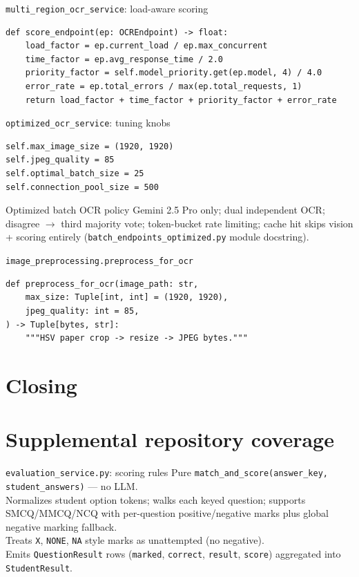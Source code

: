 \documentclass[aspectratio=169]{beamer}
\begin{document}
\begin{frame}[fragile]{\texttt{multi\_region\_ocr\_service}: load-aware scoring}
\begin{lstlisting}[style=py]
def score_endpoint(ep: OCREndpoint) -> float:
    load_factor = ep.current_load / ep.max_concurrent
    time_factor = ep.avg_response_time / 2.0
    priority_factor = self.model_priority.get(ep.model, 4) / 4.0
    error_rate = ep.total_errors / max(ep.total_requests, 1)
    return load_factor + time_factor + priority_factor + error_rate
\end{lstlisting}
\end{frame}

\begin{frame}[fragile]{\texttt{optimized\_ocr\_service}: tuning knobs}
\begin{lstlisting}[style=py]
self.max_image_size = (1920, 1920)
self.jpeg_quality = 85
self.optimal_batch_size = 25
self.connection_pool_size = 500
\end{lstlisting}
\end{frame}

\begin{frame}{Optimized batch OCR policy}
  \small
  Gemini 2.5 Pro only; dual independent OCR; disagree $\rightarrow$ third majority vote; token-bucket rate limiting; cache hit skips vision + scoring entirely (\texttt{batch\_endpoints\_optimized.py} module docstring).
\end{frame}

\begin{frame}[fragile]{\texttt{image\_preprocessing.preprocess\_for\_ocr}}
\begin{lstlisting}[style=py]
def preprocess_for_ocr(image_path: str,
    max_size: Tuple[int, int] = (1920, 1920),
    jpeg_quality: int = 85,
) -> Tuple[bytes, str]:
    """HSV paper crop -> resize -> JPEG bytes."""
\end{lstlisting}
\end{frame}

\section{Closing}

\section{Supplemental repository coverage}

\begin{frame}{\texttt{evaluation\_service.py}: scoring rules}
  \small
  Pure \texttt{match\_and\_score(answer\_key, student\_answers)} --- no LLM.\\
  Normalizes student option tokens; walks each keyed question; supports SMCQ/MMCQ/NCQ with per-question positive/negative marks plus global negative marking fallback.\\
  Treats \texttt{X}, \texttt{NONE}, \texttt{NA} style marks as unattempted (no negative).\\
  Emits \texttt{QuestionResult} rows (\texttt{marked}, \texttt{correct}, \texttt{result}, \texttt{score}) aggregated into \texttt{StudentResult}.
\end{frame}
\end{document}
